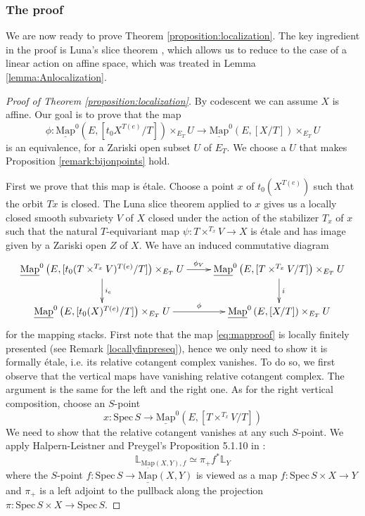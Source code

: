 \documentclass[11pt,letterpaper]{amsart}
\newcommand{\bL}{\mathbb{L}}
\newcommand{\Map}[2]{\underline{\mathrm{Map}}\left (#1,#2\right )}
\newcommand{\Mapo}[2]{\underline{\mathrm{Map}}^{0}\left (#1,#2\right )}
\newcommand{\Spec}{\mathrm{S}\mathrm{pec}\,}
\begin{document}
\subsubsection{The proof}
We are now ready to prove Theorem  \ref{proposition:localization}. The key ingredient in the proof is Luna's slice theorem \cite{Luna}, which allows us to reduce to the case of a linear action on affine space, which was treated in Lemma \ref{lemma:Anlocalization}. 
\begin{proof}[Proof of Theorem  \ref{proposition:localization}] 
By codescent we can assume $X$ is affine. Our goal is to prove that the map
\begin{equation}\label{eq:mapproof}
\phi:\Mapo{E}{[t_0 X^{T(e)}/T]}\times_{E_T} U\rightarrow\Mapo{E}{[X/T]}\times_{E_T} U
\end{equation}
is an equivalence, for a Zariski open subset $U$ of $E_T$. We choose a $U$ that makes Proposition \ref{remark:bijonpoints} hold.

First we prove that this map is étale. Choose a point $x$ of $t_0(X^{T(e)})$ such that the orbit $Tx$ is closed. The Luna slice theorem applied to $x$ gives us a locally closed smooth subvariety $V$ of $X$ closed under the action of the stabilizer $T_x$ of $x$ such that the natural $T$-equivariant map $\psi: T\times^{T_x}V\rightarrow X$ is \'etale and has image given by a Zariski open $Z$ of $X$. We have an induced commutative diagram
$$
\xymatrix{
\Mapo{E}{[t_0(T\times^{T_x}V)^{T(e)}/T]}\times_{E_T}U \ar[r]^-{\phi_V} \ar[d]^{i_e} & \Mapo{E}{[T\times^{T_x}V/T]}\times_{E_T}U\ar[d]^{i}\\
\Mapo{E}{[t_0(X)^{T(e)}/T]}\times_{E_T}U \ar[r]^-{\phi} & \Mapo{E}{[X/T]}\times_{E_T}U
}
$$
for the mapping stacks. First note that the map \eqref{eq:mapproof} is locally finitely presented (see Remark \ref{locallyfinpreseq}), hence we only need to show it is formally étale, i.e. its relative cotangent complex vanishes.
To do so, we first observe that the vertical maps have vanishing relative cotangent complex. The argument is the same for the left and the right one. As for the right vertical composition, choose an $S$-point $$x:\Spec S\rightarrow\Mapo{E}{[T\times^{T_x}V/T]}$$ 
We need to show that the relative cotangent vanishes at any such $S$-point.  
We apply Halpern-Leistner and Preygel's Proposition 5.1.10 in \cite{HLP}:
$$\bL_{\Map{X}{Y},f}\simeq \pi_+ f^\ast\bL_{Y}$$
where the $S$-point $f:\Spec S\rightarrow\Map{X}{Y}$ is viewed as a map $f:\Spec S\times X\rightarrow Y$ and $\pi_+$ is a left adjoint to the pullback along the projection $\pi:\Spec S\times X\rightarrow\Spec S$. 


\end{proof}
\end{document}
